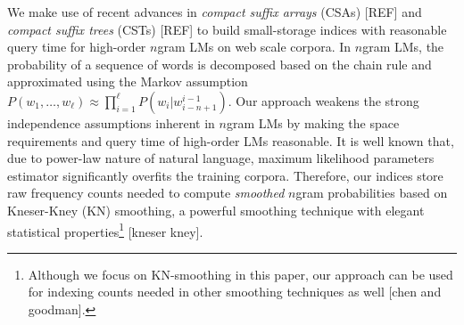 We make use of recent advances in \emph{compact suffix arrays} (CSAs) [REF] and
\emph{compact suffix trees} (CSTs) [REF] to build small-storage indices  with reasonable query time for high-order $n$gram LMs on web scale corpora.
%
In $n$gram LMs, the probability of a sequence of words is decomposed based on the chain rule 
and approximated using the Markov assumption 
$P(w_1,\ldots,w_{\ell}) \approx \prod_{i=1}^{\ell} P(w_i|w_{i-n+1}^{i-1})$. 
%
%
Our approach weakens the strong independence assumptions inherent in $n$gram LMs 
by making the space requirements  and query time of high-order LMs reasonable. 
%
It is well known that, due to power-law nature of natural language, maximum likelihood 
parameters estimator significantly overfits the training corpora. 
%
Therefore, our indices store raw frequency counts needed to compute 
\emph{smoothed} $n$gram probabilities based on Kneser-Kney (KN) smoothing, 
a powerful smoothing technique with elegant statistical properties\footnote{Although 
we focus on KN-smoothing in this paper, our approach can be used for indexing counts needed 
in other smoothing techniques as well [chen and goodman].} [kneser kney].  
% 


%






